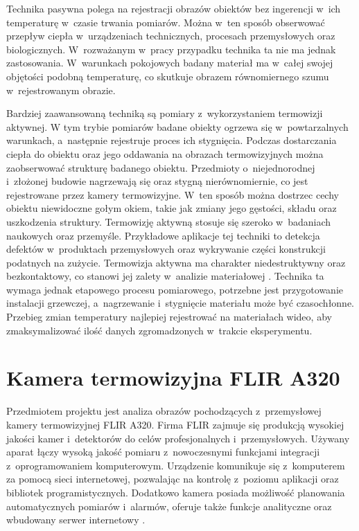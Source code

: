 Technika pasywna polega na rejestracji obrazów obiektów bez ingerencji w~ich
temperaturę w~czasie trwania pomiarów.
Można w~ten sposób obserwować przepływ ciepła w~urządzeniach technicznych,
procesach przemysłowych oraz biologicznych.
W~rozważanym w~pracy przypadku technika ta nie ma jednak zastosowania.
W~warunkach pokojowych badany materiał ma w~całej swojej objętości podobną
temperaturę, co skutkuje obrazem równomiernego szumu w~rejestrowanym obrazie.

Bardziej zaawansowaną techniką są pomiary z~wykorzystaniem termowizji
aktywnej.
W tym trybie pomiarów badane obiekty ogrzewa się w~powtarzalnych warunkach,
a~następnie rejestruje proces ich stygnięcia.
Podczas dostarczania ciepła do obiektu oraz jego oddawania na obrazach
termowizyjnych można zaobserwować strukturę badanego obiektu.
Przedmioty o~niejednorodnej i~złożonej budowie nagrzewają się oraz stygną
nierównomiernie, co jest rejestrowane przez kamery termowizyjne.
W~ten sposób można dostrzec cechy obiektu niewidoczne gołym okiem, takie
jak zmiany jego gęstości, składu oraz uszkodzenia struktury.
Termowizję aktywną stosuje się szeroko w~badaniach naukowych oraz przemyśle.
Przykładowe aplikacje tej techniki to detekcja defektów w~produktach
przemysłowych oraz wykrywanie części konstrukcji podatnych na zużycie.
Termowizja aktywna ma charakter niedestruktywny oraz bezkontaktowy,
co stanowi jej zalety w~analizie materiałowej \cite{ciampa_thermography}.
Technika ta wymaga jednak etapowego procesu pomiarowego, potrzebne jest
przygotowanie instalacji grzewczej, a~nagrzewanie i~stygnięcie materiału
może być czasochłonne.
Przebieg zmian temperatury najlepiej rejestrować na materiałach wideo,
aby zmaksymalizować ilość danych zgromadzonych w~trakcie eksperymentu.

\section{Kamera termowizyjna FLIR A320}
\label{sec:camera}
Przedmiotem projektu jest analiza obrazów pochodzących z~przemysłowej
kamery termowizyjnej FLIR A320.
Firma FLIR zajmuje się produkcją wysokiej jakości kamer i~detektorów do celów
profesjonalnych i~przemysłowych.
Używany aparat łączy wysoką jakość pomiaru z~nowoczesnymi funkcjami
integracji z~oprogramowaniem komputerowym.
Urządzenie komunikuje się z~komputerem za pomocą sieci internetowej,
pozwalając na kontrolę z~poziomu aplikacji oraz bibliotek
programistycznych.
Dodatkowo kamera posiada możliwość planowania automatycznych pomiarów
i~alarmów, oferuje także funkcje analityczne oraz wbudowany serwer
internetowy \cite{flir_a32x_manual}.

